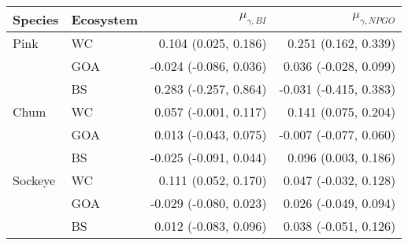 \begin{tabular}{llrr}
  \hline
Species & Ecosystem & $\mu_{\gamma,BI}$ & $\mu_{\gamma,NPGO}$ \\ 
  \hline
Pink & WC & 0.104 (0.025, 0.186) & 0.251 (0.162, 0.339) \\ 
   & GOA & -0.024 (-0.086, 0.036) & 0.036 (-0.028, 0.099) \\ 
   & BS & 0.283 (-0.257, 0.864) & -0.031 (-0.415, 0.383) \\ 
  Chum & WC & 0.057 (-0.001, 0.117) & 0.141 (0.075, 0.204) \\ 
   & GOA & 0.013 (-0.043, 0.075) & -0.007 (-0.077, 0.060) \\ 
   & BS & -0.025 (-0.091, 0.044) & 0.096 (0.003, 0.186) \\ 
  Sockeye & WC & 0.111 (0.052, 0.170) & 0.047 (-0.032, 0.128) \\ 
   & GOA & -0.029 (-0.080, 0.023) & 0.026 (-0.049, 0.094) \\ 
   & BS & 0.012 (-0.083, 0.096) & 0.038 (-0.051, 0.126) \\ 
   \hline
\end{tabular}
